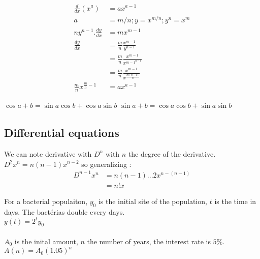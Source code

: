 \documentclass{article}
\begin{document}
                    \begin{align*}
                        \frac{d}{dx} (x^a) &= ax^{a-1}\\
                        a &= m/n ; y = x^{m/n} ; y^n = x^m\\
                        ny^{n-1}.\frac{dy}{dx} &= mx^{m-1}\\
                        \frac{dy}{dx} &= \frac{m}{n} \frac{x^{m-1}}{y^{n-1}}\\
                         &= \frac{m}{n} \frac{x^{m-1}}{x^{{m-1}^{n-1}}}\\
                         &= \frac{m}{n} \frac{x^{m-1}}{x^{\frac{m(n-1)}{n}}}\\
                         \frac{m}{n}x^{\frac{m}{n} -1} &= ax^{a-1}
                    \end{align*}

                    \begin{center}
                        $\cos a + b = \sin a \cos b + \cos a \sin b$
                        $\sin a+b = \cos a \cos b + \sin a \sin b$
                    \end{center}

        \subsection{Differential equations}

            We can note derivative with $D^n$ with $n$ the degree of the derivative.\\
            $D^2 x^n = n(n-1)x^{n-2}$ so generalizing :
            \begin{align*}
                D^{n-1} x^n &= n(n-1)...2 x^{n-(n-1)}\\
                &= n! x
            \end{align*}

            For a bacterial populaiton, $y_0$ is the initial site of the population, $t$ is the time in days. The bactérias double every days.\\
            $y(t) = 2^t y_0$\\~\\

            $A_0$ is the inital amount, $n$ the number of years, the interest rate is $5\%$.\\
            $A(n) = A_0 (1.05)^n$\\
\end{document}

